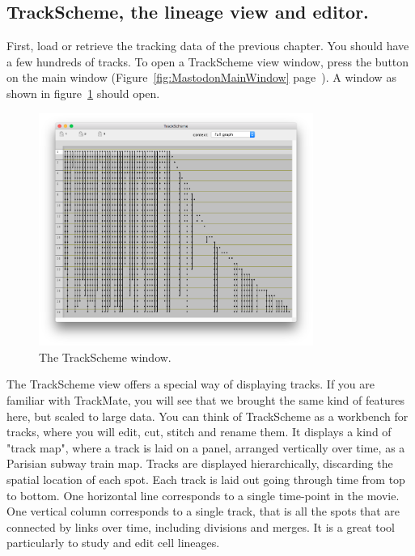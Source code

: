 \subsection{TrackScheme, the lineage view and editor.}

First, load or retrieve the tracking data of the previous chapter. 
You should have a few hundreds of tracks. 
To open a TrackScheme view window, press the  button on the main window (Figure~\ref{fig:MastodonMainWindow} page~\pageref{fig:MastodonMainWindow}).
A window as shown in figure~\ref{fig:TrackScheme} should open.

\begin{figure}
    \centering
    \includegraphics[width=0.8\textwidth,trim=0.5cm .5cm .5cm .5cm,clip]{figures/Mastodon_TrackScheme.png}
     \caption{The TrackScheme window.}
     \label{fig:TrackScheme}
\end{figure}  

The TrackScheme view offers a special way of displaying tracks. 
If you are familiar with TrackMate, you will see that we brought the same kind of features here, but scaled to large data.
You can think of TrackScheme as a workbench for tracks, where you will edit, cut, stitch and rename them.
It displays a kind of "track map", where a track is laid on a panel, arranged vertically over time, as a Parisian subway train map. 
Tracks are displayed hierarchically, discarding the spatial location of each spot. 
Each track is laid out going through time from top to bottom.
One horizontal line corresponds to a single time-point in the movie.
One vertical column corresponds to a single track, that is all the spots that are connected by links over time, including divisions and merges.
It is a great tool particularly to study and edit cell lineages.

